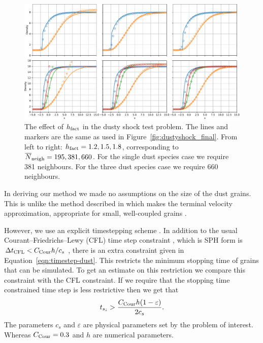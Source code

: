 \documentclass[fleqn,usenatbib]{mnras}
\begin{document}
\begin{figure}
   \begin{center}
      \includegraphics[width=\textwidth]{figs/dustyshock_hfact.pdf}
      \caption{The effect of \(h_{\rm fact}\) in the dusty shock test problem.
         The lines and markers are the same as used in
         Figure~\ref{fig:dustyshock_final}. From left to right: \(h_{\rm fact} =
         1.2, 1.5, 1.8\), corresponding to \(\overline{N}_{\rm neigh} = 195,
         381, 660\). For the single dust species case we require 381 neighbours.
         For the three dust species case we require 660 neighbours.%
         \label{fig:dustyshock_hfact}}
   \end{center}
\end{figure}

In deriving our method we made no assumptions on the size of the dust grains.
This is unlike the method described in \citet{Hutchison2018MNRAS.476.2186H}
which makes the terminal velocity approximation, appropriate for small,
well-coupled grains \citep{Youdin2005ApJ...620..459Y}.

However, we use an explicit timestepping scheme
\citep{Price2018PASA...35...31P}. In addition to the usual
Courant–Friedrichs–Lewy (CFL) time step constraint
\citep{Courant1928MatAn.100...32C}, which is SPH form is \(\Delta t_{\rm CFL} <
C_{\rm Cour} h/c_s\) \citep{Price2018PASA...35...31P}, there is an extra
constraint given in Equation~\ref{eqn:timestep-dust}. This restricts the minimum
stopping time of grains that can be simulated. To get an estimate on this
restriction we compare this constraint with the CFL constraint. If we require
that the stopping time constrained time step is less restrictive then we get
that
%
\begin{align}
   t_{s_i} > \frac{C_{\rm Cour} h (1 - \varepsilon)}{2 c_s}.
\end{align}
%
The parameters \(c_s\) and \(\varepsilon\) are physical parameters set by the
problem of interest. Whereas \(C_{\rm Cour} = 0.3\) and \(h\) are numerical
parameters.
\end{document}
